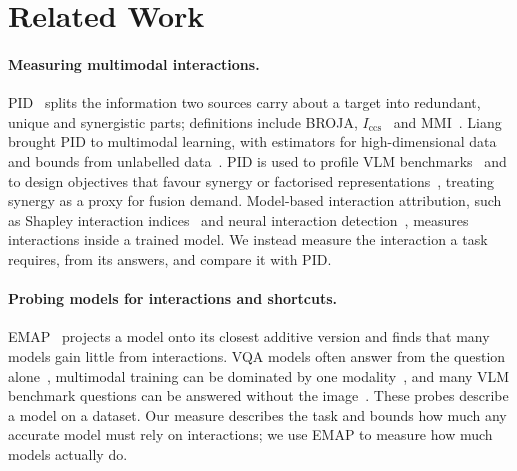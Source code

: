 \section{Related Work}
\label{sec:related}

\paragraph{Measuring multimodal interactions.}
PID~\cite{williams2010nonnegative,bertschinger2014quantifying} splits the information two sources carry about a target
into redundant, unique and synergistic parts; definitions include BROJA, $I_{\mathrm{ccs}}$~\cite{ince2017measuring} and
MMI~\cite{barrett2015exploration}. Liang \etal brought PID to multimodal learning, with estimators for
high-dimensional data~\cite{liang2023quantifying} and bounds from unlabelled data~\cite{liang2024multimodal}. PID is used
to profile VLM benchmarks~\cite{xiu2026comprehensive,fang2026towards} and to design objectives that favour synergy or
factorised representations~\cite{liang2023factorized,kontras2026synib,yarici2026synco,singh2026spice}, treating synergy
as a proxy for fusion demand. Model-based interaction attribution, such as Shapley interaction
indices~\cite{grabisch1999axiomatic} and neural interaction detection~\cite{tsang2018detecting}, measures interactions
inside a trained model. We instead measure the interaction a task requires, from its answers, and compare it with PID.

\paragraph{Probing models for interactions and shortcuts.}
EMAP~\cite{hessel2020does} projects a model onto its closest additive version and finds that many models gain little
from interactions. VQA models often answer from the question alone~\cite{goyal2017making,agrawal2018dont}, multimodal
training can be dominated by one modality~\cite{wang2020makes,peng2022balanced}, and many VLM benchmark questions can be
answered without the image~\cite{chen2024mmstar}. These probes describe a model on a dataset. Our measure describes the
task and bounds how much any accurate model must rely on interactions; we use EMAP to measure how much models actually do.

